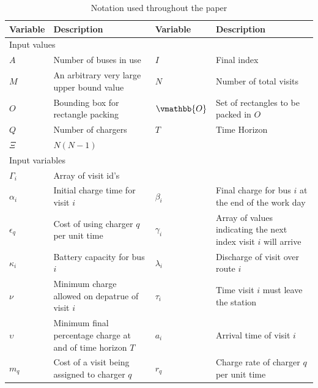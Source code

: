 \documentclass[letterpaper, 10pt, conference]{IEEEtran}
\begin{document}
\begin{table}[!t]
	\caption{Notation used throughout the paper}
	\label{tab:variables}
	\centering
	\begin{tabular}{l l l l}
		\toprule
		\textbf{Variable} & \textbf{Description} & \textbf{Variable} & \textbf{Description} \\
		\toprule
		\multicolumn{4}{l}{Input values} \\
			$A$           & Number of buses in use &
			$I$           & Final index                               \\
			$M$           & An arbitrary very large upper bound value &
			$N$           & Number of total visits                    \\
			$O$           & Bounding box for rectangle packing        &
			$\vmathbb{O}$ & Set of rectangles to be packed in \(O\)   \\
			$Q$           & Number of chargers                        &
			$T$           & Time Horizon                              \\
			$\Xi$         & $N(N-1)$                                  \\
		\hline
		\multicolumn{4}{l}{Input variables} \\
			$\Gamma_i$   & Array of visit id's                                             \\
			$\alpha_i$   & Initial charge time for visit  $i$                              &
			$\beta_{i}$  & Final charge for bus $i$ at the end of the work day             \\
			$\epsilon_q$ & Cost of using charger $q$ per unit time                         &
			$\gamma_i$   & Array of values indicating the next index visit $i$ will arrive \\
			$\kappa_i$   & Battery capacity for bus \(i\)                                  &
			$\lambda_i$  & Discharge of visit over route  $i$                              \\
			$\nu$        & Minimum charge allowed on depatrue of visit \(i\)               &
			$\tau_i$     & Time visit $i$ must leave the station                           \\
			$\upsilon$   & Minimum final percentage charge at and of time horizon \(T\)    &
			$a_i$        & Arrival time of visit  $i$                                      \\
			$m_q$        & Cost of a visit being assigned to charger  $q$                  &
			$r_q$        & Charge rate of charger $q$ per unit time                        \\

\end{tabular}
\end{table}
\end{document}
